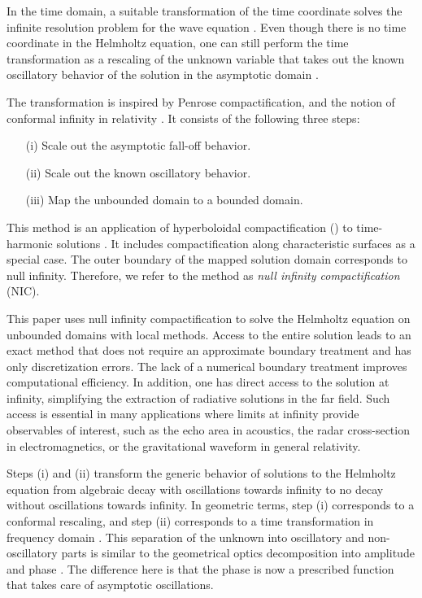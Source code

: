 \documentclass[draft,onefignum,onetabnum]{siamart190516}
\begin{document}
In the time domain, a suitable transformation of the time coordinate solves the infinite resolution problem for the wave equation \cite{ZENGINOGLU20112286}. Even though there is no time coordinate in the Helmholtz equation, one can still perform the time transformation as a rescaling of the unknown variable that takes out the known oscillatory behavior of the solution in the asymptotic domain \cite{ZengFramework}.

The transformation is inspired by Penrose compactification, and the notion of conformal infinity in relativity \cite{Penrose, Penrose65, Frauendiener2004, Winicour2012}. It consists of the following three steps:
\begin{itemize}
	\item[(i)] Scale out the asymptotic fall-off behavior.
	\item[(ii)] Scale out the known oscillatory behavior.
	\item[(iii)] Map the unbounded domain to a bounded domain.
\end{itemize}
This method is an application of hyperboloidal compactification (\cite{Zenginoglu08, ZENGINOGLU20112286, Macedo_2020}) to time-harmonic solutions \cite{ZengFramework, ansorg2016spectral, macedo2018hyperboloidal, bizon2020toy, jaramillo2021pseudospectrum, jaramillo2021gravitational, destounis2021pseudospectrum, gasperin2021physical}. It includes compactification along characteristic surfaces as a special case. The outer boundary of the mapped solution domain corresponds to null infinity. Therefore, we refer to the method as \emph{null infinity compactification} (NIC).

This paper uses null infinity compactification to solve the Helmholtz equation on unbounded domains with local methods. Access to the entire solution leads to an exact method that does not require an approximate boundary treatment and has only discretization errors. The lack of a numerical boundary treatment improves computational efficiency. In addition, one has direct access to the solution at infinity, simplifying the extraction of radiative solutions in the far field. Such access is essential in many applications where limits at infinity provide observables of interest, such as the echo area in acoustics, the radar cross-section in electromagnetics, or the gravitational waveform in general relativity.

Steps (i) and (ii) transform the generic behavior of solutions to the Helmholtz equation from algebraic decay with oscillations towards infinity to no decay without oscillations towards infinity. In geometric terms, step (i) corresponds to a conformal rescaling, and step (ii) corresponds to a time transformation in frequency domain \cite{ZengFramework}. This separation of the unknown into oscillatory and non-oscillatory parts is similar to the geometrical optics decomposition into amplitude and phase \cite{engquist2003computational}. The difference here is that the phase is now a prescribed function that takes care of asymptotic oscillations. 
\end{document}
